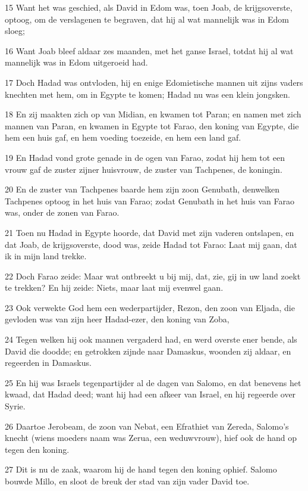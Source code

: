 \par 15 Want het was geschied, als David in Edom was, toen Joab, de krijgsoverste, optoog, om de verslagenen te begraven, dat hij al wat mannelijk was in Edom sloeg;
\par 16 Want Joab bleef aldaar zes maanden, met het ganse Israel, totdat hij al wat mannelijk was in Edom uitgeroeid had.
\par 17 Doch Hadad was ontvloden, hij en enige Edomietische mannen uit zijns vaders knechten met hem, om in Egypte te komen; Hadad nu was een klein jongsken.
\par 18 En zij maakten zich op van Midian, en kwamen tot Paran; en namen met zich mannen van Paran, en kwamen in Egypte tot Farao, den koning van Egypte, die hem een huis gaf, en hem voeding toezeide, en hem een land gaf.
\par 19 En Hadad vond grote genade in de ogen van Farao, zodat hij hem tot een vrouw gaf de zuster zijner huisvrouw, de zuster van Tachpenes, de koningin.
\par 20 En de zuster van Tachpenes baarde hem zijn zoon Genubath, denwelken Tachpenes optoog in het huis van Farao; zodat Genubath in het huis van Farao was, onder de zonen van Farao.
\par 21 Toen nu Hadad in Egypte hoorde, dat David met zijn vaderen ontslapen, en dat Joab, de krijgsoverste, dood was, zeide Hadad tot Farao: Laat mij gaan, dat ik in mijn land trekke.
\par 22 Doch Farao zeide: Maar wat ontbreekt u bij mij, dat, zie, gij in uw land zoekt te trekken? En hij zeide: Niets, maar laat mij evenwel gaan.
\par 23 Ook verwekte God hem een wederpartijder, Rezon, den zoon van Eljada, die gevloden was van zijn heer Hadad-ezer, den koning van Zoba,
\par 24 Tegen welken hij ook mannen vergaderd had, en werd overste ener bende, als David die doodde; en getrokken zijnde naar Damaskus, woonden zij aldaar, en regeerden in Damaskus.
\par 25 En hij was Israels tegenpartijder al de dagen van Salomo, en dat benevens het kwaad, dat Hadad deed; want hij had een afkeer van Israel, en hij regeerde over Syrie.
\par 26 Daartoe Jerobeam, de zoon van Nebat, een Efrathiet van Zereda, Salomo's knecht (wiens moeders naam was Zerua, een weduwvrouw), hief ook de hand op tegen den koning.
\par 27 Dit is nu de zaak, waarom hij de hand tegen den koning ophief. Salomo bouwde Millo, en sloot de breuk der stad van zijn vader David toe.
